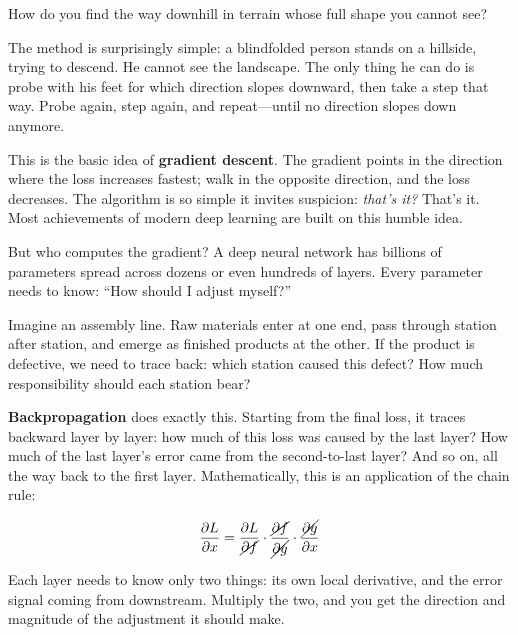 How do you find the way downhill in terrain whose full shape you cannot see?

The method is surprisingly simple: a blindfolded person stands on a hillside, trying to descend. He cannot see the landscape. The only thing he can do is probe with his feet for which direction slopes downward, then take a step that way. Probe again, step again, and repeat---until no direction slopes down anymore.

\vspace{1em}

This is the basic idea of \textbf{gradient descent}.
The gradient points in the direction where the loss increases fastest; walk in the opposite direction, and the loss decreases.
The algorithm is so simple it invites suspicion: \textit{that's it?}
That's it. Most achievements of modern deep learning are built on this humble idea.

\vspace{1em}

But who computes the gradient? A deep neural network has billions of parameters spread across dozens or even hundreds of layers. Every parameter needs to know: ``How should I adjust myself?''

\vspace{1em}

Imagine an assembly line. Raw materials enter at one end, pass through station after station, and emerge as finished products at the other. If the product is defective, we need to trace back: which station caused this defect? How much responsibility should each station bear?

\vspace{1em}

\textbf{Backpropagation} does exactly this. Starting from the final loss, it traces backward layer by layer: how much of this loss was caused by the last layer? How much of the last layer's error came from the second-to-last layer? And so on, all the way back to the first layer. Mathematically, this is an application of the chain rule:

\begin{equation*}
\frac{\partial L}{\partial x}
= \frac{\partial L}{\cancel{\partial f}}
\cdot \frac{\cancel{\partial f}}{\cancel{\partial g}}
\cdot \frac{\cancel{\partial g}}{\partial x}
\end{equation*}

Each layer needs to know only two things: its own local derivative, and the error signal coming from downstream. Multiply the two, and you get the direction and magnitude of the adjustment it should make.


